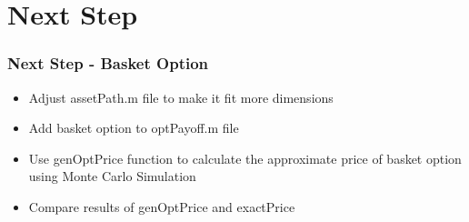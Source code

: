 \documentclass[10pt,Compress]{beamer}
\begin{document}
\section{Next Step}
\begin{frame}
\frametitle{Next Step - Basket Option}
\begin{itemize}
\item Adjust assetPath.m file to make it fit more dimensions
\item Add basket option to optPayoff.m file
\item Use genOptPrice function to calculate the approximate price of basket option using Monte Carlo Simulation
\item Compare results of genOptPrice and exactPrice
\end{itemize}
\end{frame}
\end{document}
